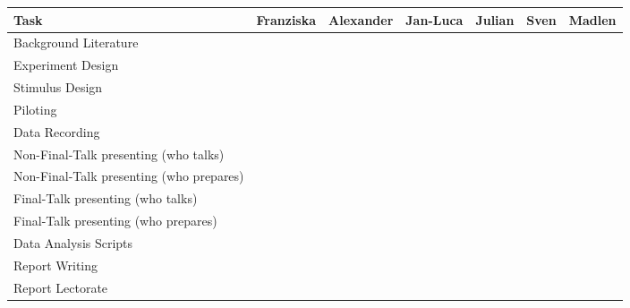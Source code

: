 \documentclass[
]{article}
\begin{document}
\begin{longtable}[]{@{}
  >{\raggedright\arraybackslash}p{}
  >{\raggedright\arraybackslash}p{}
  >{\raggedright\arraybackslash}p{}
  >{\raggedright\arraybackslash}p{}
  >{\raggedright\arraybackslash}p{}
  >{\raggedright\arraybackslash}p{}
  >{\raggedright\arraybackslash}p{}@{}}
\toprule\noalign{}
\begin{minipage}[b]{\linewidth}\raggedright
\textbf{Task}
\end{minipage} & \begin{minipage}[b]{\linewidth}\raggedright
\textbf{Franziska}
\end{minipage} & \begin{minipage}[b]{\linewidth}\raggedright
\textbf{Alexander}
\end{minipage} & \begin{minipage}[b]{\linewidth}\raggedright
\textbf{Jan-Luca}
\end{minipage} & \begin{minipage}[b]{\linewidth}\raggedright
\textbf{Julian}
\end{minipage} & \begin{minipage}[b]{\linewidth}\raggedright
\textbf{Sven}
\end{minipage} & \begin{minipage}[b]{\linewidth}\raggedright
\textbf{Madlen}
\end{minipage} \\
\midrule\noalign{}
\endhead
\bottomrule\noalign{}
\endlastfoot
Background Literature & & & & & & \\
Experiment Design & & & & & & \\
Stimulus Design & & & & & & \\
Piloting & & & & & & \\
Data Recording & & & & & & \\
Non-Final-Talk presenting (who talks) & & & & & & \\
Non-Final-Talk presenting (who prepares) & & & & & & \\
Final-Talk presenting (who talks) & & & & & & \\
Final-Talk presenting (who prepares) & & & & & & \\
Data Analysis Scripts & & & & & & \\
Report Writing & & & & & & \\
Report Lectorate & & & & & & \\
\end{longtable}
\end{document}
